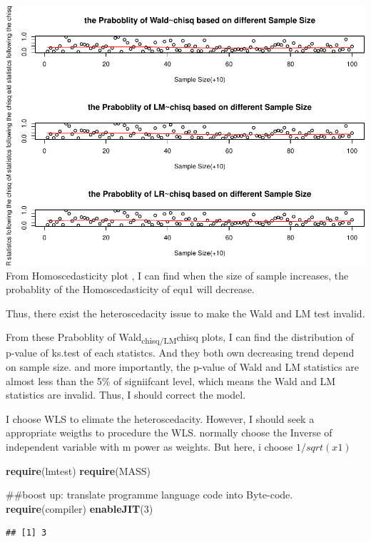 \documentclass[]{article}
\newenvironment{Shaded}{\begin{snugshade}}{\end{snugshade}}
\newcommand{\KeywordTok}[1]{\textcolor[rgb]{0.13,0.29,0.53}{\textbf{{#1}}}}
\newcommand{\DecValTok}[1]{\textcolor[rgb]{0.00,0.00,0.81}{{#1}}}
\newcommand{\NormalTok}[1]{{#1}}
\begin{document}
\includegraphics{BST169Coursework_project_answer_files/figure-latex/Monte Carlo:heter-uncorrected-2.pdf}
From Homoscedasticity plot , I can find when the size of sample
increases, the probablity of the Homoscedasticity of equ1 will decrease.

Thus, there exist the heteroscedacity issue to make the Wald and LM test
invalid.

From these Praboblity of Wald\textsubscript{chisq/LM}chisq plots, I can
find the distribution of p-value of ks.test of each statistcs. And they
both own decreasing trend depend on sample size. and more importantly,
the p-value of Wald and LM statistics are almost less than the 5\% of
signiifcant level, which means the Wald and LM statistics are invalid.
Thus, I should correct the model.

I choose WLS to elimate the heteroscedacity. However, I should seek a
appropriate weigths to procedure the WLS. normally choose the Inverse of
independent variable with m power as weights. But here, i choose
\(1/sqrt(x1)\)

\begin{Shaded}
\begin{Highlighting}[]
\KeywordTok{require}\NormalTok{(lmtest)}
\KeywordTok{require}\NormalTok{(MASS)}


\NormalTok{##boost up: translate programme language code into Byte-code.}
\KeywordTok{require}\NormalTok{(compiler)}
\KeywordTok{enableJIT}\NormalTok{(}\DecValTok{3}\NormalTok{)}
\end{Highlighting}
\end{Shaded}

\begin{verbatim}
## [1] 3
\end{verbatim}
\end{document}
